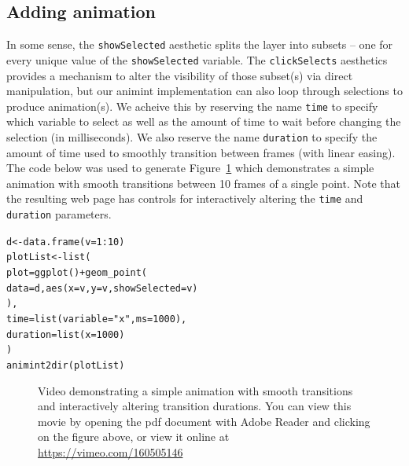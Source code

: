 \documentclass[journal]{vgtc}\usepackage[]{graphicx}\usepackage[]{color}
\makeatletter
\newcommand{\hlnum}[1]{\textcolor[rgb]{0,0,0}{#1}}%
\newcommand{\hlstr}[1]{\textcolor[rgb]{0.502,0,0}{#1}}%
\newcommand{\hlopt}[1]{\textcolor[rgb]{0,0,0}{#1}}%
\newcommand{\hlstd}[1]{\textcolor[rgb]{0,0,0}{#1}}%
\newcommand{\hlkwb}[1]{\textcolor[rgb]{0,0,0}{#1}}%
\newcommand{\hlkwc}[1]{\textcolor[rgb]{0,0,1}{#1}}%
\newcommand{\hlkwd}[1]{\textcolor[rgb]{0,0,0}{#1}}%
\newenvironment{kframe}{%
 \def\at@end@of@kframe{}%
 \ifinner\ifhmode%
  \def\at@end@of@kframe{\end{minipage}}%
  \begin{minipage}{\columnwidth}%
 \fi\fi%
 \def\FrameCommand##1{\hskip\@totalleftmargin \hskip-\fboxsep
 \colorbox{shadecolor}{##1}\hskip-\fboxsep
     \hskip-\linewidth \hskip-\@totalleftmargin \hskip\columnwidth}%
 \MakeFramed {\advance\hsize-\width
   \@totalleftmargin\z@ \linewidth\hsize
   \@setminipage}}%
 {\par\unskip\endMakeFramed%
 \at@end@of@kframe}
\newenvironment{knitrout}{}{} %
\makeatother
\begin{document}
\subsection{Adding animation}
\label{sec:animation}

In some sense, the \texttt{showSelected} aesthetic splits the layer into subsets -- one for every unique value of the \texttt{showSelected} variable. The \texttt{clickSelects} aesthetics provides a mechanism to alter the visibility of those subset(s) via direct manipulation, but our animint implementation can also loop through selections to produce animation(s). We acheive this by reserving the name \texttt{time} to specify which variable to select as well as the amount of time to wait before changing the selection (in milliseconds). We also reserve the name \texttt{duration} to specify the amount of time used to smoothly transition between frames (with linear easing). The code below was used to generate Figure~\ref{fig:animation} which demonstrates a simple animation with smooth transitions between 10 frames of a single point. Note that the resulting web page has controls for interactively altering the \texttt{time} and \texttt{duration} parameters. 

\begin{knitrout}
\color{fgcolor}\begin{kframe}
\begin{alltt}
\hlstd{d} \hlkwb{<-} \hlkwd{data.frame}\hlstd{(}\hlkwc{v} \hlstd{=} \hlnum{1}\hlopt{:}\hlnum{10}\hlstd{)}
\hlstd{plotList} \hlkwb{<-} \hlkwd{list}\hlstd{(}
  \hlkwc{plot} \hlstd{=} \hlkwd{ggplot}\hlstd{()} \hlopt{+} \hlkwd{geom_point}\hlstd{(}
    \hlkwc{data} \hlstd{= d,} \hlkwd{aes}\hlstd{(}\hlkwc{x}\hlstd{=v,} \hlkwc{y}\hlstd{=v,} \hlkwc{showSelected}\hlstd{=v)}
  \hlstd{),}
  \hlkwc{time} \hlstd{=} \hlkwd{list}\hlstd{(}\hlkwc{variable} \hlstd{=} \hlstr{"x"}\hlstd{,} \hlkwc{ms} \hlstd{=} \hlnum{1000}\hlstd{),}
  \hlkwc{duration} \hlstd{=} \hlkwd{list}\hlstd{(}\hlkwc{x} \hlstd{=} \hlnum{1000}\hlstd{)}
\hlstd{)}
\hlkwd{animint2dir}\hlstd{(plotList)}
\end{alltt}
\end{kframe}
\end{knitrout}


\begin{figure}[htp]
	\centerline{}
	\label{fig:animation}
	\caption{Video demonstrating a simple animation with smooth transitions and interactively altering transition durations. You can view this movie by opening the pdf document with Adobe Reader and clicking on the figure above, or view it online at \url{https://vimeo.com/160505146}}
\end{figure}
\end{document}

